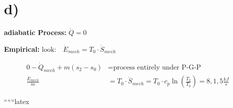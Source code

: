 

\section*{d)}

\textbf{adiabatic Process:} \(\dot{Q} = 0\)

\textbf{Empirical:} \(\text{look:} \quad \dot{E}_{mech} = T_0 \cdot \dot{S}_{mech}\)

\begin{align*}
0 - \dot{Q}_{mech} + m \left( s_2 - s_0 \right) &= \text{process entirely under P-G-P} \\
\frac{\dot{E}_{mech}}{\dot{m}} &= T_0 \cdot \dot{S}_{mech} = T_0 \cdot c_p \ln \left( \frac{T_2}{T_0} \right) = 8,1,5 \frac{kJ}{s}
\end{align*}

``````latex